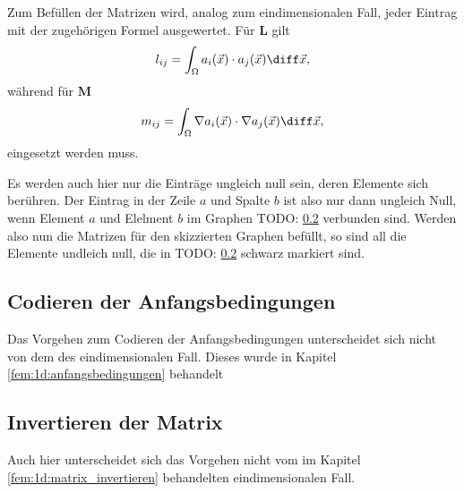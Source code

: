 Zum Befüllen der Matrizen wird, analog zum eindimensionalen Fall, jeder Eintrag mit der zugehörigen Formel ausgewertet.
Für $\mathbf{L}$ gilt
\begin{equation}
    l_{ij} = \int_{\Omega} a_i(\vec{x}) \cdot a_j(\vec{x}) \diff \vec{x},
\end{equation}
während für $\mathbf{M}$ 
\begin{equation}
    m_{ij} = \int_{\Omega} \nabla a_i(\vec{x}) \cdot \nabla a_j(\vec{x}) \diff \vec{x},
\end{equation}
eingesetzt werden muss.

Es werden auch hier nur die Einträge ungleich null sein, deren Elemente sich berühren.
Der Eintrag in der Zeile $a$ und Spalte $b$ ist also nur dann ungleich Null, wenn Element $a$ und Elelment $b$ im Graphen TODO: \ref{} verbunden sind.
Werden also nun die Matrizen für den skizzierten Graphen befüllt, so sind all die Elemente undleich null, die in TODO: \ref{} schwarz markiert sind.

\subsection{Codieren der Anfangsbedingungen}
Das Vorgehen zum Codieren der Anfangsbedingungen unterscheidet sich nicht von dem des eindimensionalen Fall. 
Dieses wurde in Kapitel \ref{fem:1d:anfangsbedingungen} behandelt

\subsection{Invertieren der Matrix}
Auch hier unterscheidet sich das Vorgehen nicht vom im Kapitel \ref{fem:1d:matrix_invertieren} behandelten eindimensionalen Fall.